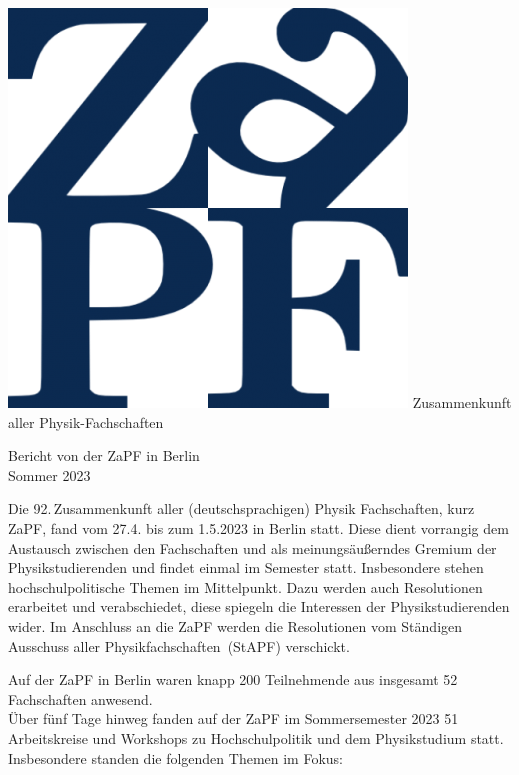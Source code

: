 \documentclass{scrartcl}
\begin{document}
\hspace{0.74\textwidth}
\begin{minipage}{0.25\textwidth}
      \vspace{-1cm}
      \centering
      \includegraphics[width=.89\textwidth]{logo.png}
      \small Zusammenkunft aller Physik-Fachschaften
\end{minipage}

\begin{center}
      \vspace{1.5cm}
      \huge{Bericht von der ZaPF in Berlin \\ Sommer 2023}
      \vspace{1cm}
\end{center}

Die 92.\,Zusammenkunft aller (deutschsprachigen) Physik Fachschaften, kurz ZaPF, fand vom 27.4. bis zum 1.5.2023 in Berlin statt. Diese dient vorrangig dem Austausch zwischen den Fachschaften und als meinungsäußerndes Gremium der Physikstudierenden und findet einmal im Semester statt.
Insbesondere stehen hochschulpolitische Themen im Mittelpunkt. 
Dazu werden auch Resolutionen erarbeitet und verabschiedet, diese spiegeln die Interessen der Physikstudierenden wider.
Im Anschluss an die ZaPF werden die Resolutionen vom Ständigen Ausschuss aller Physikfachschaften~(StAPF) verschickt.
 
Auf der ZaPF in Berlin waren knapp 200 Teilnehmende aus insgesamt 52 Fachschaften anwesend.\\
Über fünf Tage hinweg fanden auf der ZaPF im Sommersemester 2023 51 Arbeitskreise und Workshops zu Hochschulpolitik und dem Physikstudium statt. Insbesondere standen die folgenden Themen im Fokus:
\end{document}
